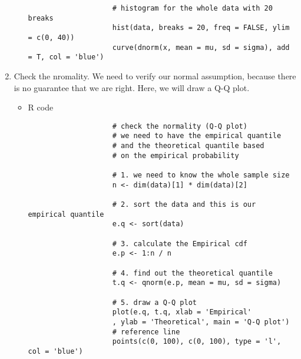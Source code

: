 \begin{enumerate}
\begin{itemize}
\begin{verbatim}
					# histogram for the whole data with 20 breaks
					hist(data, breaks = 20, freq = FALSE, ylim = c(0, 40))
					curve(dnorm(x, mean = mu, sd = sigma), add = T, col = 'blue')
				\end{verbatim}
		\end{itemize}
	\item Check the nromality. We need to verify our normal assumption, because there is no guarantee that we are right. Here, we will draw a Q-Q plot.
		\begin{itemize}
			\item R code
				\begin{verbatim}
					# check the normality (Q-Q plot)
					# we need to have the empirical quantile 
					# and the theoretical quantile based 
					# on the empirical probability
					
					# 1. we need to know the whole sample size
					n <- dim(data)[1] * dim(data)[2]
					
					# 2. sort the data and this is our empirical quantile
					e.q <- sort(data)
					
					# 3. calculate the Empirical cdf
					e.p <- 1:n / n
					
					# 4. find out the theoretical quantile
					t.q <- qnorm(e.p, mean = mu, sd = sigma)
					
					# 5. draw a Q-Q plot
					plot(e.q, t.q, xlab = 'Empirical'
					, ylab = 'Theoretical', main = 'Q-Q plot')
					# reference line
					points(c(0, 100), c(0, 100), type = 'l', col = 'blue') 
				\end{verbatim}
		\end{itemize}
\end{enumerate}